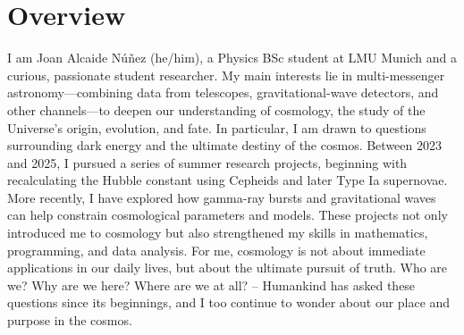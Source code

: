 \documentclass[a4paper,11pt]{article}
\begin{document}
\section{\textbf{Overview}}
\vspace{1mm}
\small{
I am Joan Alcaide Núñez (he/him), a Physics BSc student at LMU Munich and a curious, passionate student researcher. My main interests lie in multi-messenger astronomy—combining data from telescopes, gravitational-wave detectors, and other channels—to deepen our understanding of cosmology, the study of the Universe’s origin, evolution, and fate. In particular, I am drawn to questions surrounding dark energy and the ultimate destiny of the cosmos.
\vspace{2.5mm}
Between 2023 and 2025, I pursued a series of summer research projects, beginning with recalculating the Hubble constant using Cepheids and later Type Ia supernovae. More recently, I have explored how gamma-ray bursts and gravitational waves can help constrain cosmological parameters and models. These projects not only introduced me to cosmology but also strengthened my skills in mathematics, programming, and data analysis.
\vspace{2.5mm}
For me, cosmology is not about immediate applications in our daily lives, but about the ultimate pursuit of truth. Who are we? Why are we here? Where are we at all? – Humankind has asked these questions since its beginnings, and I too continue to wonder about our place and purpose in the cosmos.
\vspace{-2mm}



}
\end{document}
